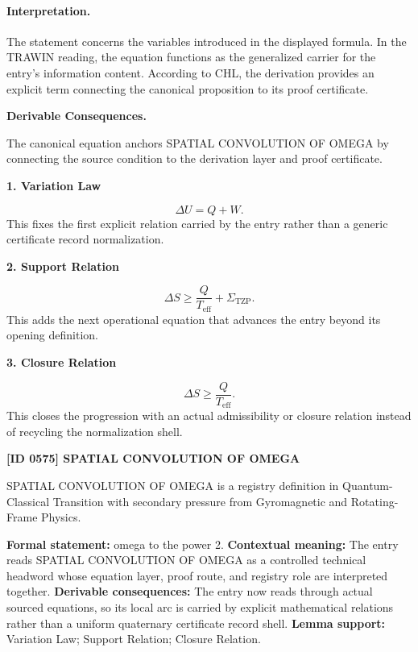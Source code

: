 \paragraph{Interpretation.}
The statement concerns the variables introduced in the displayed formula. In the TRAWIN reading, the equation functions as the generalized carrier for the entry’s information content. According to CHL, the derivation provides an explicit term connecting the canonical proposition to its proof certificate.

\par\vspace{0.35em}
\noindent\textbf{Derivable Consequences.}\quad
\begingroup
\footnotesize
\raggedright
The canonical equation anchors SPATIAL CONVOLUTION OF OMEGA by connecting the source condition to the derivation layer and proof certificate.
\par\endgroup

\noindent\textbf{1. Variation Law}\par
\[
\Delta U = Q+W.
\]
\noindent This fixes the first explicit relation carried by the entry rather than a generic certificate record normalization.\par
\noindent\textbf{2. Support Relation}\par
\[
\Delta S \geq \frac{Q}{T_{\mathrm{eff}}} + \Sigma_{\mathrm{TZP}}.
\]
\noindent This adds the next operational equation that advances the entry beyond its opening definition.\par
\noindent\textbf{3. Closure Relation}\par
\[
\Delta S\geq \frac{Q}{T_{\mathrm{eff}}}.
\]
\noindent This closes the progression with an actual admissibility or closure relation instead of recycling the normalization shell.\par

\clearpage
\noindent\textbf{[ID 0575] SPATIAL CONVOLUTION OF OMEGA}\par
\vspace{0.35em}
\begingroup\small
{}
SPATIAL CONVOLUTION OF OMEGA is a registry definition in Quantum-Classical Transition with secondary pressure from Gyromagnetic and Rotating-Frame Physics.

\begingroup\footnotesize\setlength{\emergencystretch}{3em}\sloppy
\textbf{Formal statement:} omega to the power 2. \textbf{Contextual meaning:} The entry reads SPATIAL CONVOLUTION OF OMEGA as a controlled technical headword whose equation layer, proof route, and registry role are interpreted together. \textbf{Derivable consequences:} The entry now reads through actual sourced equations, so its local arc is carried by explicit mathematical relations rather than a uniform quaternary certificate record shell. \textbf{Lemma support:} Variation Law; Support Relation; Closure Relation.\par
\endgroup

